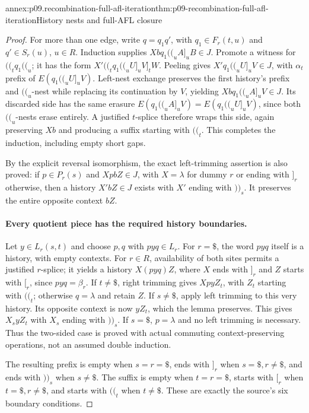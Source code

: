 \begin{annexitem}{annex:p09.recombination-full-afl-iteration}{thm:p09-recombination-full-afl-iteration}{History nests and full-AFL closure}
\begin{proof}
For more than one edge, write \(q=q_1q'\), with
\(q_1\in F_r(t,u)\) and \(q'\in S_r(u)\), \(u\in R\).
Induction supplies
\(Xbq_1\mathopen{(\!(}_uA]_uB\in J\).
Promote a witness for \(\mathopen{(\!(}_tq_1\mathopen{(\!(}_u\); it has the form
\(X'\mathopen{(\!(}_tq_1\mathopen{(\!(}_uU]_uV]_tW\).
Peeling gives \(X'q_1\mathopen{(\!(}_uU]_uV\in J\), with \(\alpha_t\)
prefix of \(E(q_1\mathopen{(\!(}_uU]_uV)\).
Left-nest exchange preserves the first history's prefix and \(\mathopen{(\!(}_u\)-nest
while replacing its continuation by \(V\), yielding
\(Xbq_1\mathopen{(\!(}_uA]_uV\in J\).
Its discarded side has the same erasure
\(E(q_1\mathopen{(\!(}_uA]_uV)=E(q_1\mathopen{(\!(}_uU]_uV)\), since both \(\mathopen{(\!(}_u\)-nests
erase entirely. A justified \(t\)-splice therefore wraps this side,
again preserving \(Xb\) and producing a suffix starting with \(\mathopen{(\!(}_t\).
This completes the induction, including empty short gaps.

By the explicit reversal isomorphism, the exact left-trimming assertion
is also proved: if \(p\in P_r(s)\) and \(XpbZ\in J\), with
\(X=\lambda\) for dummy \(r\) or ending with \(]_r\) otherwise,
then a history \(X'bZ\in J\) exists with \(X'\) ending with \(\mathclose{)\!)}_s\).
It preserves the entire opposite context \(bZ\).

\paragraph{Every quotient piece has the required history boundaries.}
Let \(y\in L_r(s,t)\) and choose \(p,q\) with \(pyq\in L_r\).
For \(r=\$\), the word \(pyq\) itself is a history, with empty contexts.
For \(r\in R\), availability of both sites permits a justified \(r\)-splice;
it yields a history \(X(pyq)Z\), where \(X\) ends with \(]_r\)
and \(Z\) starts with \([_r\), since \(pyq=\beta_r\).
If \(t\ne\$\), right trimming gives \(XpyZ_t\), with \(Z_t\)
starting with \(\mathopen{(\!(}_t\); otherwise \(q=\lambda\) and retain \(Z\).
If \(s\ne\$\), apply left trimming to this very history.
Its opposite context is now \(yZ_t\), which the lemma preserves.
This gives \(X_syZ_t\) with \(X_s\) ending with \(\mathclose{)\!)}_s\).
If \(s=\$\), \(p=\lambda\) and no left trimming is necessary.
Thus the two-sided case is proved with actual commuting context-preserving
operations, not an assumed double induction.

The resulting prefix is empty when \(s=r=\$\), ends with \(]_r\)
when \(s=\$,r\ne\$\), and ends with \(\mathclose{)\!)}_s\) when \(s\ne\$\).
The suffix is empty when \(t=r=\$\), starts with \([_r\)
when \(t=\$,r\ne\$\), and starts with \(\mathopen{(\!(}_t\) when \(t\ne\$\).
These are exactly the source's six boundary conditions.


\end{proof}
\end{annexitem}

